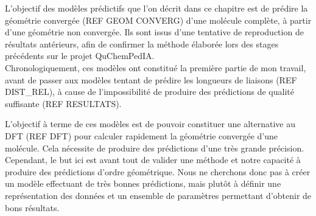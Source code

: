 \par L'objectif des modèles prédictifs que l'on décrit dans ce chapitre est de prédire la géométrie convergée (REF GEOM CONVERG) d'une molécule complète, à partir d'une géométrie non convergée. Ils sont issus d'une tentative de reproduction de résultats antérieurs, afin de confirmer la méthode élaborée lors des stages précédents sur le projet QuChemPedIA.\\
Chronologiquement, ces modèles ont constitué la première partie de mon travail, avant de passer aux modèles tentant de prédire les longueurs de liaisons (REF DIST\_REL), à cause de l'impossibilité de produire des prédictions de qualité suffisante (REF RESULTATS).\\

\par L'objectif à terme de ces modèles est de pouvoir constituer une alternative au DFT (REF DFT) pour calculer rapidement la géométrie convergée d'une molécule. Cela nécessite de produire des prédictions d'une très grande précision. Cependant, le but ici est avant tout de valider une méthode et notre capacité à produire des prédictions d'ordre géométrique. Nous ne cherchons donc pas à créer un modèle effectuant de très bonnes prédictions, mais plutôt à définir une représentation des données et un ensemble de paramètres permettant d'obtenir de bons résultats.

